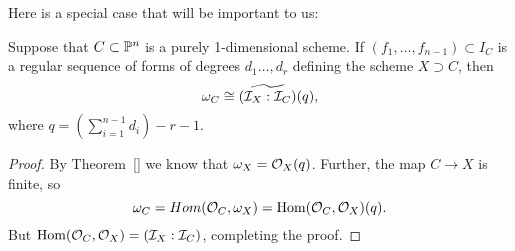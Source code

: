 % 
%
%

Here is a special case that will be important to us:
\begin{proposition}\label{computation of omega}
 Suppose that 
$C \subset {\mathbb P}^{n}$ is a purely 1-dimensional scheme. If $(f_{1}, \dots, f_{n-1}) \subset I_{C}$ is a regular sequence of forms of degrees $d_{1}\dots,d_{r}$ defining the scheme $X\supset C$, then 
$$
\omega_{C}\cong \widetilde{({\mathcal I}_{X}:{\mathcal I}_{C})}(q),
$$
where $q = (\sum_{i=1}^{n-1} d_{i}) -r-1.$
\end{proposition}
\begin{proof}
 By Theorem~\ref{} we know that $\omega_{X} = {\mathcal O}_{X}(q)$. Further, the map
 $C\to X$ is finite, so 
 $$
 \omega_{C} = Hom({\mathcal O}_{C}, \omega_{X}) = \operatorname{Hom}({\mathcal O}_{C}, {\mathcal O}_{X})(q).
 $$
 But $\operatorname{Hom}({\mathcal O}_{C}, {\mathcal O}_{X}) = ({\mathcal I}_{X}:{\mathcal I}_{C})$, completing the proof.
\end{proof}

